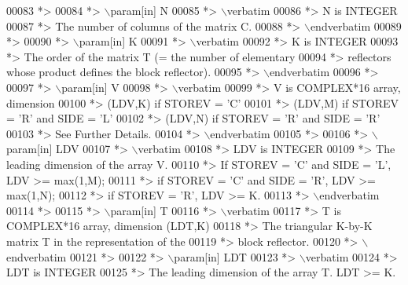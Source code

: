 \begin{DoxyCode}
00083 \textcolor{comment}{*>}
00084 \textcolor{comment}{*> \(\backslash\)param[in] N}
00085 \textcolor{comment}{*> \(\backslash\)verbatim}
00086 \textcolor{comment}{*>          N is INTEGER}
00087 \textcolor{comment}{*>          The number of columns of the matrix C.}
00088 \textcolor{comment}{*> \(\backslash\)endverbatim}
00089 \textcolor{comment}{*>}
00090 \textcolor{comment}{*> \(\backslash\)param[in] K}
00091 \textcolor{comment}{*> \(\backslash\)verbatim}
00092 \textcolor{comment}{*>          K is INTEGER}
00093 \textcolor{comment}{*>          The order of the matrix T (= the number of elementary}
00094 \textcolor{comment}{*>          reflectors whose product defines the block reflector).}
00095 \textcolor{comment}{*> \(\backslash\)endverbatim}
00096 \textcolor{comment}{*>}
00097 \textcolor{comment}{*> \(\backslash\)param[in] V}
00098 \textcolor{comment}{*> \(\backslash\)verbatim}
00099 \textcolor{comment}{*>          V is COMPLEX*16 array, dimension}
00100 \textcolor{comment}{*>                                (LDV,K) if STOREV = 'C'}
00101 \textcolor{comment}{*>                                (LDV,M) if STOREV = 'R' and SIDE = 'L'}
00102 \textcolor{comment}{*>                                (LDV,N) if STOREV = 'R' and SIDE = 'R'}
00103 \textcolor{comment}{*>          See Further Details.}
00104 \textcolor{comment}{*> \(\backslash\)endverbatim}
00105 \textcolor{comment}{*>}
00106 \textcolor{comment}{*> \(\backslash\)param[in] LDV}
00107 \textcolor{comment}{*> \(\backslash\)verbatim}
00108 \textcolor{comment}{*>          LDV is INTEGER}
00109 \textcolor{comment}{*>          The leading dimension of the array V.}
00110 \textcolor{comment}{*>          If STOREV = 'C' and SIDE = 'L', LDV >= max(1,M);}
00111 \textcolor{comment}{*>          if STOREV = 'C' and SIDE = 'R', LDV >= max(1,N);}
00112 \textcolor{comment}{*>          if STOREV = 'R', LDV >= K.}
00113 \textcolor{comment}{*> \(\backslash\)endverbatim}
00114 \textcolor{comment}{*>}
00115 \textcolor{comment}{*> \(\backslash\)param[in] T}
00116 \textcolor{comment}{*> \(\backslash\)verbatim}
00117 \textcolor{comment}{*>          T is COMPLEX*16 array, dimension (LDT,K)}
00118 \textcolor{comment}{*>          The triangular K-by-K matrix T in the representation of the}
00119 \textcolor{comment}{*>          block reflector.}
00120 \textcolor{comment}{*> \(\backslash\)endverbatim}
00121 \textcolor{comment}{*>}
00122 \textcolor{comment}{*> \(\backslash\)param[in] LDT}
00123 \textcolor{comment}{*> \(\backslash\)verbatim}
00124 \textcolor{comment}{*>          LDT is INTEGER}
00125 \textcolor{comment}{*>          The leading dimension of the array T. LDT >= K.}

\end{DoxyCode}
